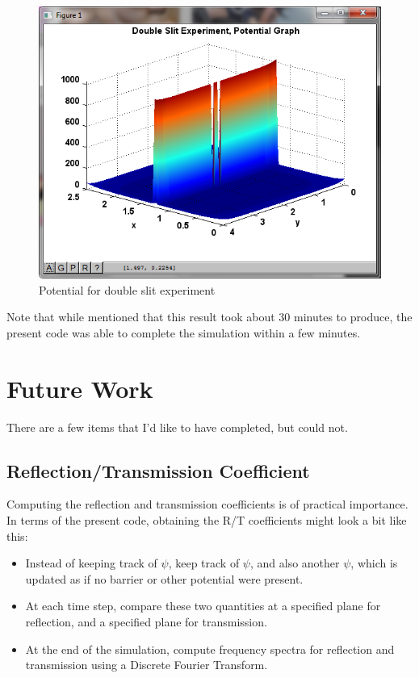 \documentclass[letterpaper,12pt]{article}
\begin{document}
\begin{figure}[!htbp]
\centering
\includegraphics[scale=0.85,trim = 10mm 10mm 4mm 8mm,clip=true]{potential.png}
\caption{Potential for double slit experiment}
\label{fig:ds3}
\end{figure}

Note that while \citep{reference} mentioned that this result took about 30 minutes to produce, the present code was able to complete the simulation within a few minutes.

\section{Future Work}

There are a few items that I'd like to have completed, but could not.

\subsection{Reflection/Transmission Coefficient}

Computing the reflection and transmission coefficients is of practical importance.  In terms of the present code, obtaining the R/T coefficients might look a bit like this:

\begin{itemize}
  \item Instead of keeping track of $\psi$, keep track of $\psi$, and also another $\psi$, which is updated as if no barrier or other potential were present.  
  \item At each time step, compare these two quantities at a specified plane for reflection, and a specified plane for transmission.
  \item At the end of the simulation, compute frequency spectra for reflection and transmission using a Discrete Fourier Transform.
 \end{itemize}
\end{document}
